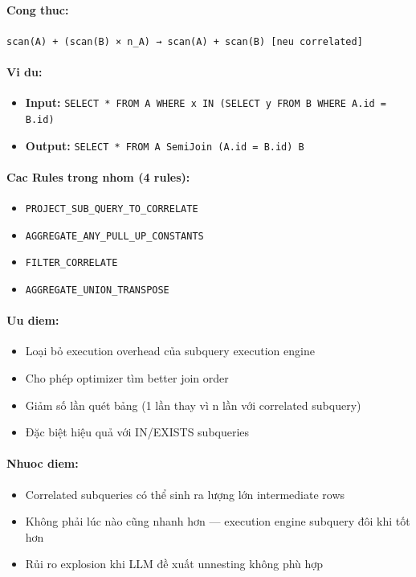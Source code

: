 \paragraph{Cong thuc:} \texttt{scan(A) + (scan(B) × n_A) → scan(A) + scan(B) [neu correlated]}
\paragraph{Vi du:}
\begin{itemize}
\item \textbf{Input:} \texttt{SELECT * FROM A WHERE x IN (SELECT y FROM B WHERE A.id = B.id)}
\item \textbf{Output:} \texttt{SELECT * FROM A SemiJoin (A.id = B.id) B}
\end{itemize}
\paragraph{Cac Rules trong nhom (4 rules):}
\begin{itemize}
\item \texttt{PROJECT_SUB_QUERY_TO_CORRELATE}
\item \texttt{AGGREGATE_ANY_PULL_UP_CONSTANTS}
\item \texttt{FILTER_CORRELATE}
\item \texttt{AGGREGATE_UNION_TRANSPOSE}
\end{itemize}
\paragraph{Uu diem:}
\begin{itemize}
\item Loại bỏ execution overhead của subquery execution engine
\item Cho phép optimizer tìm better join order
\item Giảm số lần quét bảng (1 lần thay vì n lần với correlated subquery)
\item Đặc biệt hiệu quả với IN/EXISTS subqueries
\end{itemize}
\paragraph{Nhuoc diem:}
\begin{itemize}
\item Correlated subqueries có thể sinh ra lượng lớn intermediate rows
\item Không phải lúc nào cũng nhanh hơn — execution engine subquery đôi khi tốt hơn
\item Rủi ro explosion khi LLM đề xuất unnesting không phù hợp
\end{itemize}
\newpage

